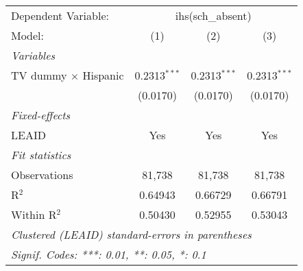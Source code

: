 \begin{tabular}{lccc}
\tabularnewline\midrule\midrule
Dependent Variable:&\multicolumn{3}{c}{ihs(sch\_absent)}\\
Model:&(1) & (2) & (3)\\
\midrule \emph{Variables}&   &   &  \\
TV dummy $\times$ Hispanic & 0.2313$^{***}$ & 0.2313$^{***}$ & 0.2313$^{***}$\\
  &(0.0170) & (0.0170) & (0.0170)\\
\midrule \emph{Fixed-effects}&   &   &  \\
LEAID & Yes & Yes & Yes\\
\midrule \emph{Fit statistics}&  & & \\
Observations & 81,738&81,738&81,738\\
R$^2$ & 0.64943&0.66729&0.66791\\
Within R$^2$ & 0.50430&0.52955&0.53043\\
\midrule\midrule\multicolumn{4}{l}{\emph{Clustered (LEAID) standard-errors in parentheses}}\\
\multicolumn{4}{l}{\emph{Signif. Codes: ***: 0.01, **: 0.05, *: 0.1}}\\
\end{tabular}


